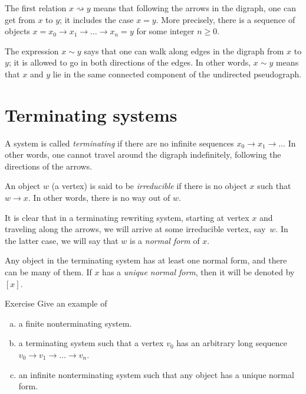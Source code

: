 The first relation $x\rightsquigarrow y$ means that following the arrows in the digraph,
one can get from $x$ to $y$; it includes the case $x=y$.
More precisely, there is a sequence of objects $x=x_0\to x_1\to\dots\to x_n=y$ for some integer $n\ge 0$.

The expression $x \sim y$ says that one can walk along edges in the digraph from $x$ to $y$;
it is allowed to go in both directions of the edges.
In other words, $x \sim y$ means that $x$ and $y$ lie in the same connected component of the undirected pseudograph.

\section{Terminating systems}

A system is called \emph{terminating} if there are no infinite sequences $x_0 \to x_1 \to \dots $
In other words, one cannot travel around the digraph indefinitely, following the directions of the arrows.

An object $w$ (a vertex) is said to be \emph{irreducible} if there is no object $x$ such that $w \to x$.
In other words, there is no way out of $w$.

It is clear that in a terminating rewriting system, starting at vertex $x$ and traveling along the arrows, we will arrive at some irreducible vertex, say~$w$.
In the latter case, we will say that $w$ is a \emph{normal form} of $x$.

Any object in the terminating system has at least one normal form, and there can be many of them.
If $x$ has a {}\emph{unique normal form}, then it will be denoted by $[x]$.



\begin{thm}{Exercise}\label{ex:examples}
Give an example of 
\begin{enumerate}[(a)]
\item a finite nonterminating system.
\item a terminating system such that a vertex $v_0$ has an arbitrary long sequence $v_0 \to v_1 \to \dots \to v_n$.
\item an infinite nonterminating  system such that any object has a unique normal form.
\end{enumerate}

\end{thm}

